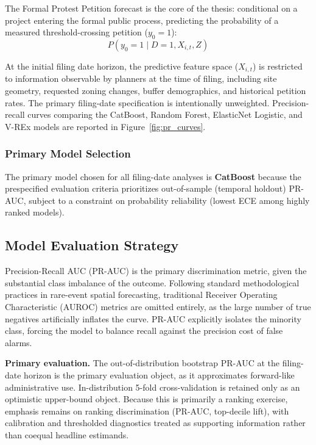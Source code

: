 \documentclass[11pt, letterpaper]{article}
\begin{document}
The Formal Protest Petition forecast is the core of the thesis: conditional on a project entering the formal public process, predicting the probability of a measured threshold-crossing petition ($y_0 = 1$):
\begin{equation}
P(y_0 = 1 \mid D=1, X_{i,t}, Z)
\end{equation}

At the initial filing date horizon, the predictive feature space ($X_{i,t}$) is restricted to information observable by planners at the time of filing, including site geometry, requested zoning changes, buffer demographics, and historical petition rates. The primary filing-date specification is intentionally unweighted. Precision-recall curves comparing the CatBoost, Random Forest, ElasticNet Logistic, and V-REx models are reported in Figure~\ref{fig:pr_curves}.



\subsubsection{Primary Model Selection}
The primary model chosen for all filing-date analyses is \textbf{CatBoost} because the prespecified evaluation criteria prioritizes out-of-sample (temporal holdout) PR-AUC, subject to a constraint on probability reliability (lowest ECE among highly ranked models).



  \subsection{Model Evaluation Strategy}

Precision-Recall AUC (PR-AUC) is the primary discrimination metric, given the substantial class imbalance of the outcome. Following standard methodological practices in rare-event spatial forecasting, traditional Receiver Operating Characteristic (AUROC) metrics are omitted entirely, as the large number of true negatives artificially inflates the curve. PR-AUC explicitly isolates the minority class, forcing the model to balance recall against the precision cost of false alarms.

\textbf{Primary evaluation.} The out-of-distribution bootstrap PR-AUC at the filing-date horizon is the primary evaluation object, as it approximates forward-like administrative use. In-distribution 5-fold cross-validation is retained only as an optimistic upper-bound object. Because this is primarily a ranking exercise, emphasis remains on ranking discrimination (PR-AUC, top-decile lift), with calibration and thresholded diagnostics treated as supporting information rather than coequal headline estimands.
\end{document}
